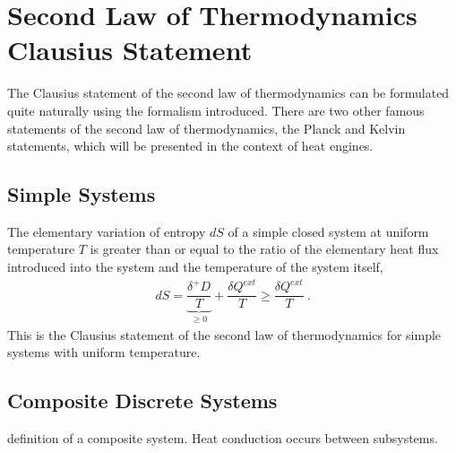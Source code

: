 \documentclass[letterpaper,10pt,english]{jupyterBook}
\begin{document}
\sphinxstepscope


\section{Second Law of Thermodynamics \sphinxhyphen{} Clausius Statement}
\label{\detokenize{ch/principles-second:second-law-of-thermodynamics-clausius-statement}}\label{\detokenize{ch/principles-second:physics-hs-thermodynamics-foundation-principles-second}}\label{\detokenize{ch/principles-second::doc}}
\sphinxAtStartPar
The Clausius statement of the second law of thermodynamics can be formulated quite naturally using the formalism introduced. There are two other famous statements of the second law of thermodynamics, the Planck and Kelvin statements, which will be presented in the context of heat engines.


\subsection{Simple Systems}
\label{\detokenize{ch/principles-second:simple-systems}}\label{\detokenize{ch/principles-second:physics-hs-thermodynamics-foundation-principles-second-simple}}
\sphinxAtStartPar
The elementary variation of entropy \(d S\) of a simple closed system at uniform temperature \(T\) is greater than or equal to the ratio of the elementary heat flux introduced into the system and the temperature of the system itself,
\begin{equation*}
\begin{split}dS = \underbrace{\dfrac{\delta^+ D}{T}}_{\ge 0} + \dfrac{\delta Q^{ext}}{T} \ge \dfrac{\delta Q^{ext}}{T} \ .\end{split}
\end{equation*}
\sphinxAtStartPar
This is the Clausius statement of the second law of thermodynamics for simple systems with uniform temperature.


\subsection{Composite Discrete Systems}
\label{\detokenize{ch/principles-second:composite-discrete-systems}}\label{\detokenize{ch/principles-second:physics-hs-thermodynamics-principles-second-composite}}
\sphinxAtStartPar
{} definition of a composite system. Heat conduction occurs between subsystems.
\end{document}
